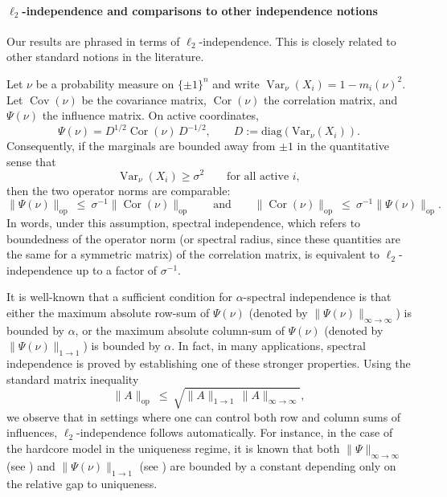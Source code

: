 \documentclass[11pt,reqno,letterpaper]{amsart}
\DeclareMathOperator*{\Cor}{\text{Cor}}
\DeclareMathOperator*{\op}{\textrm{op}}
\newcommand{\Var}{\operatorname{Var}}
\newcommand{\Cov}{\operatorname{Cov}}
\numberwithin{equation}{section}
\theoremstyle{definition}
\begin{document}
\paragraph{\bf $\ell_2$-independence and comparisons to other independence notions}
Our results are phrased in terms of {$\ell_2$-independence}. This is closely related to other standard notions in the literature. 

Let $\nu$ be a probability measure on $\{\pm1\}^n$ and write $\Var_\nu(X_i)=1-m_i(\nu)^2$.
Let $\Cov(\nu)$ be the covariance matrix, $\Cor(\nu)$ the correlation matrix, and $\Psi(\nu)$ the influence
matrix. On active coordinates,
\[
\Psi(\nu)=D^{1/2}\Cor(\nu)\,D^{-1/2},
\qquad
D:=\mathrm{diag}(\mathrm{Var}_\nu(X_i)).
\]
Consequently, if the marginals are bounded away from $\pm1$ in the quantitative sense that
\begin{equation}
\label{eq:var-lower-intro}
\Var_\nu(X_i)\ge \sigma^2 \qquad\text{for all active }i,
\end{equation}
then the two operator norms are comparable:
\begin{equation}
\label{eq:cor-vs-psi-intro}
\|\Psi(\nu)\|_{\op}\ \le\ \sigma^{-1}\|\Cor(\nu)\|_{\op}
\qquad\text{and}\qquad
\|\Cor(\nu)\|_{\op}\ \le\ \sigma^{-1}\|\Psi(\nu)\|_{\op}.
\end{equation}
In words, under this assumption, spectral independence, which refers to boundedness of the operator norm (or spectral radius, since these quantities are the same for a symmetric matrix) of the correlation matrix, is equivalent to $\ell_2$-independence up to a factor of $\sigma^{-1}$.  



It is well-known that a sufficient condition for $\alpha$-spectral independence is that either the maximum absolute row-sum of $\Psi(\nu)$ (denoted by $\|\Psi(\nu)\|_{\infty\to\infty}$) is bounded by $\alpha$, or the maximum absolute column-sum of $\Psi(\nu)$ (denoted by $\|\Psi(\nu)\|_{1\to1}$) is bounded by $\alpha$. In fact, in many applications, spectral independence is proved by establishing one of these stronger properties. Using the standard matrix inequality
\begin{equation}
\label{eq:l1-linf-to-l2-intro}
\|A\|_{\op}\ \le\ \sqrt{\|A\|_{1\to 1}\,\|A\|_{\infty\to\infty}},
\end{equation}
we observe that in settings where one can control both row and column sums of influences, $\ell_2$-independence follows automatically. For instance, in the case of the hardcore model in the uniqueness regime, it is known that both $\|\Psi\|_{\infty \to \infty}$ (see \cite{chen2023rapid}) and $\|\Psi(\nu)\|_{1 \to 1}$ (see \cite{anari2020spectral}) are bounded by a constant depending only on the relative gap to uniqueness.   
\end{document}
